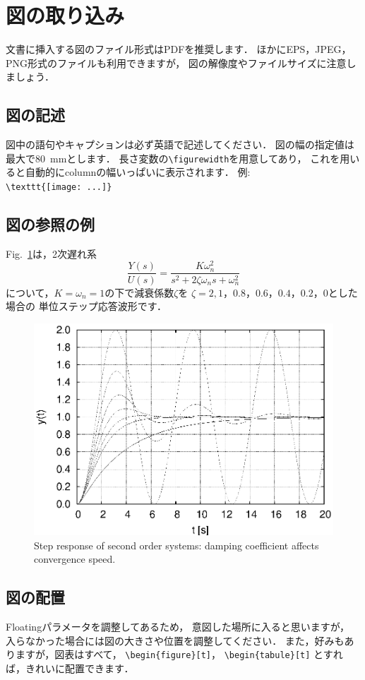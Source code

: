 \documentclass[twocolumn]{jsarticle}
\begin{document}
\section{図の取り込み}
\LaTeXe 文書に挿入する図のファイル形式はPDFを推奨します．
ほかにEPS，JPEG，PNG形式のファイルも利用できますが，
図の解像度やファイルサイズに注意しましょう．

\subsection{図の記述}
図中の語句やキャプションは必ず英語で記述してください．
図の幅の指定値は最大で80~mmとします．
長さ変数の\verb+\figurewidth+を用意してあり，
これを用いると自動的にcolumnの幅いっぱいに表示されます．
例:\\
{\small \verb+\texttt{[image: ...]}+}

\subsection{図の参照の例}
Fig.~\ref{fig:snapthru}は，2次遅れ系
%
\begin{equation}
  \frac{Y(s)}{U(s)} = \frac{K\omega_n^2}{s^2+2\zeta \omega_n s + \omega_n^2}
\end{equation}
%
について，$K=\omega_n=1$の下で減衰係数$\zeta$を
$\zeta=2,1$，$0.8$，$0.6$，$0.4$，$0.2$，$0$とした場合の
単位ステップ応答波形です．
%
\begin{figure}[tb]
  \centering
  \includegraphics[width=0.8\linewidth]{fig/StepResponse.eps}
  \caption{Step response of second order systems: 
    damping coefficient affects convergence speed.}
  \label{fig:snapthru}
\end{figure}

\subsection{図の配置}
Floatingパラメータを調整してあるため，
意図した場所に入ると思いますが，
入らなかった場合には図の大きさや位置を調整してください．
また，好みもありますが，図表はすべて，
\verb+\begin{figure}[t]+，
\verb+\begin{tabule}[t]+
とすれば，きれいに配置できます．
\end{document}
